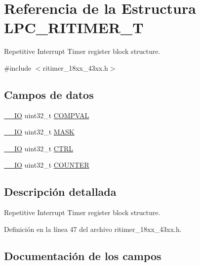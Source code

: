 \hypertarget{struct_l_p_c___r_i_t_i_m_e_r___t}{}\section{Referencia de la Estructura L\+P\+C\+\_\+\+R\+I\+T\+I\+M\+E\+R\+\_\+T}
\label{struct_l_p_c___r_i_t_i_m_e_r___t}


Repetitive Interrupt Timer register block structure.  




{\ttfamily \#include $<$ritimer\+\_\+18xx\+\_\+43xx.\+h$>$}

\subsection*{Campos de datos}
\begin{DoxyCompactItemize}
\item 
\hyperlink{core__sc300_8h_aec43007d9998a0a0e01faede4133d6be}{\+\_\+\+\_\+\+IO} uint32\+\_\+t \hyperlink{struct_l_p_c___r_i_t_i_m_e_r___t_a023c39aa448e237129eaadeb8203cc88}{C\+O\+M\+P\+V\+AL}
\item 
\hyperlink{core__sc300_8h_aec43007d9998a0a0e01faede4133d6be}{\+\_\+\+\_\+\+IO} uint32\+\_\+t \hyperlink{struct_l_p_c___r_i_t_i_m_e_r___t_a5c955643593b4aedbe9f84f054d26522}{M\+A\+SK}
\item 
\hyperlink{core__sc300_8h_aec43007d9998a0a0e01faede4133d6be}{\+\_\+\+\_\+\+IO} uint32\+\_\+t \hyperlink{struct_l_p_c___r_i_t_i_m_e_r___t_a15fc8d35f045f329b80c544bef35ff64}{C\+T\+RL}
\item 
\hyperlink{core__sc300_8h_aec43007d9998a0a0e01faede4133d6be}{\+\_\+\+\_\+\+IO} uint32\+\_\+t \hyperlink{struct_l_p_c___r_i_t_i_m_e_r___t_a55977865c315a9e732b833af88b4dca0}{C\+O\+U\+N\+T\+ER}
\end{DoxyCompactItemize}


\subsection{Descripción detallada}
Repetitive Interrupt Timer register block structure. 

Definición en la línea 47 del archivo ritimer\+\_\+18xx\+\_\+43xx.\+h.



\subsection{Documentación de los campos}
